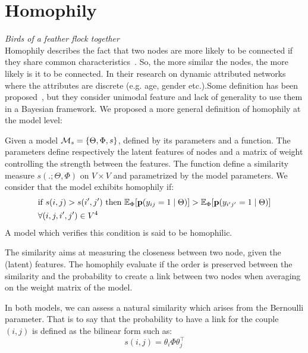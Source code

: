 \section{Homophily}
\emph{Birds of a feather flock together} ~\\


Homophily describes the fact that two nodes are more likely to be connected if they share common characteristics~\cite{mcpherson2001birds,lazarsfeld1954friendship}. So, the more similar the nodes, the more likely is it to be connected. In their research on dynamic attributed networks where the attributes are discrete (e.g. age, gender etc.).Some definition has been proposed~\cite{la2010randomization}, but they consider unimodal feature and lack of generality to use them in a Bayesian framework. We proposed a more general definition of homophily at the model level:

\begin{definition}[Homophily]
	Given  a model $\mathcal{M}_s=\{\Theta, \Phi, s\}$, defined by its parameters and a function. The parameters define respectively the latent features of nodes and a matrix of weight controlling the strength between the features. The function define a similarity measure $s(. ;\Theta, \Phi)$ on $V\times V$ and parametrized by the model parameters. We consider that the model exhibits homophily if:
	\begin{align*}
	&\textnormal{if }  s(i,j) > s(i',j') \textnormal{ then } \mathbb{E}_\Phi[\mathbf{p}(y_{ij}=1 \mid \Theta)] > \mathbb{E}_\Phi[\mathbf{p}(y_{i'j'}=1  \mid \Theta)] \\
	&\forall (i,j,i',j') \in V^4 \nonumber 
	\end{align*}
 A model which verifies this condition is said to be homophilic.
\end{definition}

The similarity aims at measuring the closeness between two node, given the (latent) features. The homophily evaluate if the order is preserved between the similarity and the probability to create a link between two nodes when averaging on the weight matrix of the model.

In both models, we can assess a natural similarity which arises from the Bernoulli parameter. That is to say that the probability to have a link for the couple $(i,j)$ is defined as the bilinear form such as: 
\begin{equation}
s(i,j) = \theta_i \Phi \theta_j^\top
\end{equation}

